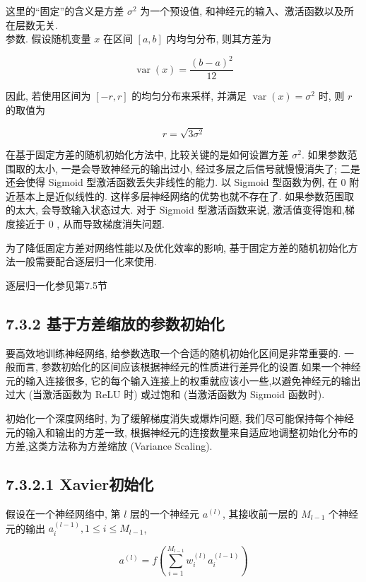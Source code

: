 \documentclass[10pt]{article}
\begin{document}
这里的“固定”的含义是方差 $\sigma^{2}$ 为一个预设值, 和神经元的输入、激活函数以及所在层数无关.\\
参数. 假设随机变量 $x$ 在区间 $[a, b]$ 内均匀分布, 则其方差为


\begin{equation*}
\operatorname{var}(x)=\frac{(b-a)^{2}}{12} \tag{7.35}
\end{equation*}


因此, 若使用区间为 $[-r, r]$ 的均匀分布来采样, 并满足 $\operatorname{var}(x)=\sigma^{2}$ 时, 则 $r$的取值为


\begin{equation*}
r=\sqrt{3 \sigma^{2}} \tag{7.36}
\end{equation*}


在基于固定方差的随机初始化方法中, 比较关键的是如何设置方差 $\sigma^{2}$. 如果参数范围取的太小, 一是会导致神经元的输出过小, 经过多层之后信号就慢慢消失了; 二是还会使得 Sigmoid 型激活函数丢失非线性的能力. 以 Sigmoid 型函数为例, 在 0 附近基本上是近似线性的. 这样多层神经网络的优势也就不存在了. 如果参数范围取的太大, 会导致输入状态过大. 对于 Sigmoid 型激活函数来说, 激活值变得饱和,梯度接近于 0 , 从而导致梯度消失问题.

为了降低固定方差对网络性能以及优化效率的影响, 基于固定方差的随机初始化方法一般需要配合逐层归一化来使用.

逐层归一化参见第7.5节

\subsection*{7.3.2 基于方差缩放的参数初始化}
要高效地训练神经网络, 给参数选取一个合适的随机初始化区间是非常重要的. 一般而言, 参数初始化的区间应该根据神经元的性质进行差异化的设置.如果一个神经元的输入连接很多, 它的每个输入连接上的权重就应该小一些,以避免神经元的输出过大 (当激活函数为 ReLU 时) 或过饱和 (当激活函数为 Sigmoid 函数时).

初始化一个深度网络时, 为了缓解梯度消失或爆炸问题, 我们尽可能保持每个神经元的输入和输出的方差一致, 根据神经元的连接数量来自适应地调整初始化分布的方差,这类方法称为方差缩放 (Variance Scaling).

\subsection*{7.3.2.1 Xavier初始化}
假设在一个神经网络中, 第 $l$ 层的一个神经元 $a^{(l)}$, 其接收前一层的 $M_{l-1}$ 个神经元的输出 $a_{i}^{(l-1)}, 1 \leq i \leq M_{l-1}$,


\begin{equation*}
a^{(l)}=f\left(\sum_{i=1}^{M_{l-1}} w_{i}^{(l)} a_{i}^{(l-1)}\right) \tag{7.37}
\end{equation*}
\end{document}
